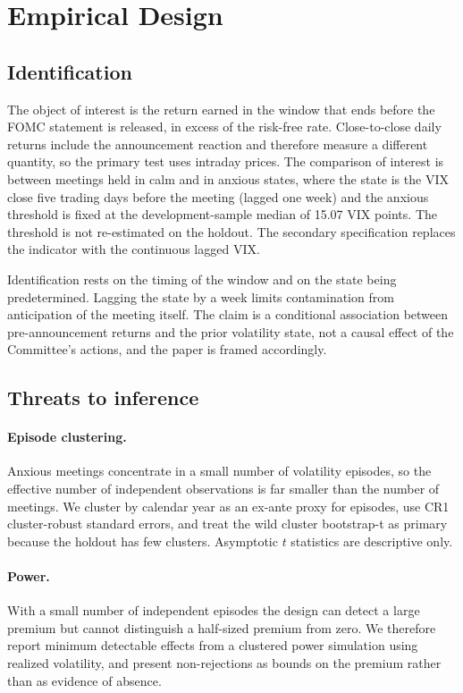 \section{Empirical Design}

\subsection{Identification}
The object of interest is the return earned in the window that ends before the
FOMC statement is released, in excess of the risk-free rate. Close-to-close daily
returns include the announcement reaction and therefore measure a different
quantity, so the primary test uses intraday prices. The comparison of interest is
between meetings held in calm and in anxious states, where the state is the VIX
close five trading days before the meeting (lagged one week) and the anxious
threshold is fixed at the development-sample median of 15.07 VIX points. The
threshold is not re-estimated on the holdout. The secondary specification
replaces the indicator with the continuous lagged VIX.

Identification rests on the timing of the window and on the state being
predetermined. Lagging the state by a week limits contamination from
anticipation of the meeting itself. The claim is a conditional association
between pre-announcement returns and the prior volatility state, not a causal
effect of the Committee's actions, and the paper is framed accordingly.

\subsection{Threats to inference}
\paragraph{Episode clustering.} Anxious meetings concentrate in a small number of
volatility episodes, so the effective number of independent observations is far
smaller than the number of meetings. We cluster by calendar year as an
ex-ante proxy for episodes, use CR1 cluster-robust standard errors, and treat
the wild cluster bootstrap-t as primary because the holdout has few clusters.
Asymptotic $t$ statistics are descriptive only.

\paragraph{Power.} With a small number of independent episodes the design can
detect a large premium but cannot distinguish a half-sized premium from zero. We
therefore report minimum detectable effects from a clustered power simulation
using realized volatility, and present non-rejections as bounds on the premium
rather than as evidence of absence.


